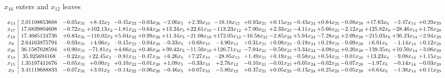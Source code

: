 \documentclass[9pt]{article}
\begin{document}
 $ x_{16} $ enters and $ x_{12} $ leaves 

 \[\begin{array}{c| c c@{\hskip 2pt} c@{\hskip 2pt} c@{\hskip 2pt} c@{\hskip 2pt} c@{\hskip 2pt} c@{\hskip 2pt} c@{\hskip 2pt} c@{\hskip 2pt} c@{\hskip 2pt} c@{\hskip 2pt} c@{\hskip 2pt} c@{\hskip 2pt} c@{\hskip 2pt} c@{\hskip 2pt} c@{\hskip 2pt} }
 x_{13}   &  2.01198653688 & -0.05 x_{31} & +  8.42 x_{2} & -0.45 x_{22} & -0.03 x_{26} & -2.00 x_{5} & +  2.39 x_{10} & -16.18 x_{12} & +  0.93 x_{21} & +  0.15 x_{23} & -0.43 x_{24} & +  0.64 x_{25} & -0.08 x_{28} & + 17.63 x_{6} & -2.47 x_{14} & +  0.29 x_{29}\\
 x_{17}   &  17.6839804608 & -0.72 x_{31} & + 102.13 x_{2} & -1.81 x_{22} & -0.64 x_{26} & + 13.24 x_{5} & + 22.61 x_{10} & -113.23 x_{12} & +  7.00 x_{21} & +  2.33 x_{23} & -4.11 x_{24} & +  5.66 x_{25} & -2.12 x_{28} & + 125.82 x_{6} & -28.46 x_{14} & +  1.76 x_{29}\\
 x_{18}   &  17.4685124736 & +  0.83 x_{31} & -110.02 x_{2} & +  5.04 x_{22} & +  0.99 x_{26} & + 11.34 x_{5} & -21.08 x_{10} & + 172.05 x_{12} & -10.58 x_{21} & -2.85 x_{23} & +  5.94 x_{24} & -7.28 x_{25} & +  2.09 x_{28} & -215.03 x_{6} & + 36.23 x_{14} & -2.94 x_{29}\\
 x_{8}   &  2.64163875794 & -0.03 x_{31} & +  4.06 x_{2} & -0.15 x_{22} & -0.04 x_{26} & -0.33 x_{5} & +  0.68 x_{10} & -4.90 x_{12} & +  0.31 x_{21} & +  0.08 x_{23} & -0.19 x_{24} & +  0.19 x_{25} & -0.09 x_{28} & +  6.01 x_{6} & -1.14 x_{14} & +  0.12 x_{29}\\
 x_{20}   &  36.1587628594 & +  0.90 x_{31} & -71.81 x_{2} & +  4.66 x_{22} & +  0.46 x_{26} & + 39.42 x_{5} & -11.50 x_{10} & + 126.71 x_{12} & -7.94 x_{21} & -0.50 x_{23} & +  3.34 x_{24} & -4.08 x_{25} & +  0.20 x_{28} & -139.35 x_{6} & + 10.50 x_{14} & -3.06 x_{29}\\
 x_{19}   &  35.925694168 & -0.22 x_{31} & + 22.45 x_{2} & -0.81 x_{22} & -0.47 x_{26} & +  6.26 x_{5} & +  7.27 x_{10} & -28.85 x_{12} & +  1.49 x_{21} & +  0.19 x_{23} & -0.58 x_{24} & +  0.54 x_{25} & -0.01 x_{28} & + 13.23 x_{6} & -9.08 x_{14} & +  1.15 x_{29}\\
 x_{15}   &  1.35197411676 & -0.05 x_{31} & +  0.00 x_{2} & +  0.10 x_{22} & -0.01 x_{26} & +  1.09 x_{5} & -0.33 x_{10} & +  2.76 x_{12} & -0.10 x_{21} & -0.01 x_{23} & +  0.05 x_{24} & -0.02 x_{25} & -0.07 x_{28} & -1.97 x_{6} & -0.14 x_{14} & -0.03 x_{29}\\
 x_{9}   &  3.41119688833 & -0.07 x_{31} & +  3.91 x_{2} & -0.14 x_{22} & -0.06 x_{26} & -0.46 x_{5} & +  0.67 x_{10} & -5.80 x_{12} & +  0.37 x_{21} & +  0.05 x_{23} & -0.13 x_{24} & +  0.25 x_{25} & -0.05 x_{28} & +  6.64 x_{6} & -1.38 x_{14} & +  0.11 x_{29}\\

\end{array}\]
\end{document}
